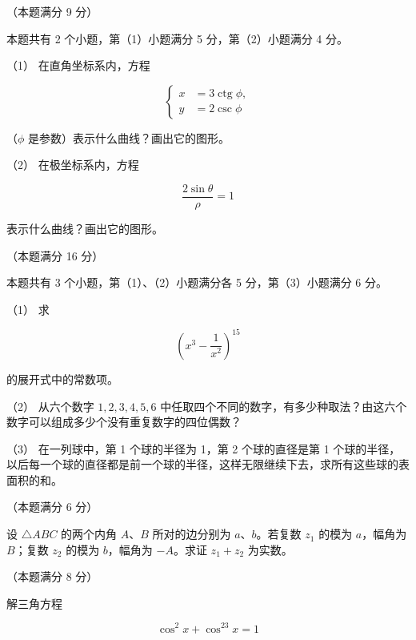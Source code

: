 \begin{question}
（本题满分 9 分）

本题共有 2 个小题，第（1）小题满分 5 分，第（2）小题满分 4 分。

（1） 在直角坐标系内，方程

\nopagebreak[4]
\[
\left\{\begin{aligned}
x&=3\operatorname{ctg}\phi,\\
y&=2\operatorname{csc}\phi
\end{aligned}\right.
\]

（$\phi$ 是参数）表示什么曲线？画出它的图形。

（2） 在极坐标系内，方程

\nopagebreak[4]
\[
\frac{2\sin\theta}{\rho}=1
\]

表示什么曲线？画出它的图形。
\nopagebreak[4]
\begin{center}\end{center}
\nopagebreak[4]
\end{question}
\begin{question}
（本题满分 16 分）

本题共有 3 个小题，第（1）、（2）小题满分各 5 分，第（3）小题满分 6 分。

（1） 求

\nopagebreak[4]
\[
\left(x^3-\frac1{x^2}\right)^{15}
\]

的展开式中的常数项。

（2） 从六个数字 $1,2,3,4,5,6$ 中任取四个不同的数字，有多少种取法？由这六个数字可以组成多少个没有重复数字的四位偶数？

（3） 在一列球中，第 1 个球的半径为 1，第 2 个球的直径是第 1 个球的半径，以后每一个球的直径都是前一个球的半径，这样无限继续下去，求所有这些球的表面积的和。

\end{question}
\begin{question}
（本题满分 6 分）

设 $\triangle ABC$ 的两个内角 $A\text{、}B$ 所对的边分别为 $a\text{、}b$。若复数 $z_1$ 的模为 $a$，幅角为 $B$；复数 $z_2$ 的模为 $b$，幅角为 $-A$。求证 $z_1+z_2$ 为实数。

\end{question}
\begin{question}
（本题满分 8 分）

解三角方程

\nopagebreak[4]
\[
\cos^2x+\cos^23x=1
\]

\end{question}
